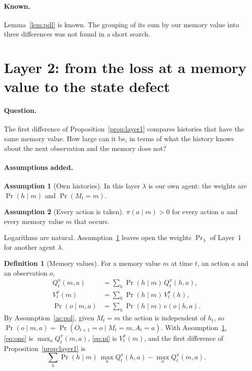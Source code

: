 \documentclass{article}
\theoremstyle{definition}
\newtheorem{definition}[proposition]{Definition}
\newtheorem{assumption}{Assumption}
\numberwithin{equation}{section}
\newcommand{\Prl}{\Pr\nolimits_{\lambda}}
\begin{document}
\paragraph{Known.} Lemma~\ref{lem:pdl} is known. The grouping of its sum by our memory value into three differences was not found in a short search.

\section{Layer 2: from the loss at a memory value to the state defect}\label{sec:layer2}

\paragraph{Question.} The first difference of Proposition~\ref{prop:layer1} compares histories that have the same memory value. How large can it be, in terms of what the history knows about the next observation and the memory does not?

\paragraph{Assumptions added.}
\begin{assumption}[Own histories]\label{as:own}
In this layer $\lambda$ is our own agent: the weights are $\Pr(h\mid m)$ and $\Pr(M_t=m)$.
\end{assumption}
\begin{assumption}[Every action is taken]\label{as:pos}
$\pi(a\mid m)>0$ for every action $a$ and every memory value $m$ that occurs.
\end{assumption}
Logarithms are natural. Assumption~\ref{as:own} leaves open the weights $\Prl$ of Layer~1 for another agent $\lambda$.

\begin{definition}[Memory values]\label{def:memvalue}
For a memory value $m$ at time $t$, an action $a$ and an observation $o$,
\begin{align*}
Q^\pi_t(m,a)&=\sum_h\Pr(h\mid m)\,Q^\pi_t(h,a),\\
V^\pi_t(m)&=\sum_h\Pr(h\mid m)\,V^\pi_t(h),\\
\Pr(o\mid m,a)&=\sum_h\Pr(h\mid m)\,e(o\mid h,a).
\end{align*}
By Assumption~\ref{as:pol}, given $M_t=m$ the action is independent of $h_t$, so $\Pr(o\mid m,a)=\Pr(O_{t+1}=o\mid M_t=m,A_t=a)$. With Assumption~\ref{as:own}, \eqref{eq:one} is $\max_aQ^\pi_t(m,a)$, \eqref{eq:pi} is $V^\pi_t(m)$, and the first difference of Proposition~\ref{prop:layer1} is
\begin{equation}\label{eq:loss}
\sum_h\Pr(h\mid m)\,\max_aQ^\pi_t(h,a)-\max_aQ^\pi_t(m,a).
\end{equation}
\end{definition}
\end{document}
